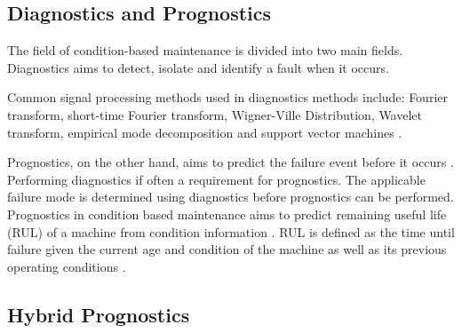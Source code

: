 



\subsection{Diagnostics and Prognostics}

The field of condition-based maintenance is divided into two main fields. Diagnostics aims to detect, isolate and identify a fault when it occurs. 

Common signal processing methods used in diagnostics methods include: Fourier transform, short-time Fourier transform, Wigner-Ville Distribution, Wavelet transform, empirical mode decomposition and support vector machines \cite{Salameh2018}. 

Prognostics, on the other hand, aims to predict the failure event before it occurs \citep{Jardine2006}. Performing diagnostics if often a requirement for prognostics. The applicable failure mode is determined using diagnostics before prognostics can be performed. Prognostics in condition based maintenance aims to predict remaining useful life (RUL) of a machine from condition information \citep{Lei2018}. RUL is defined as the time until failure given the current age and condition of the machine as well as its previous operating conditions \citep{Jardine2006}.


\subsection{Hybrid Prognostics}



